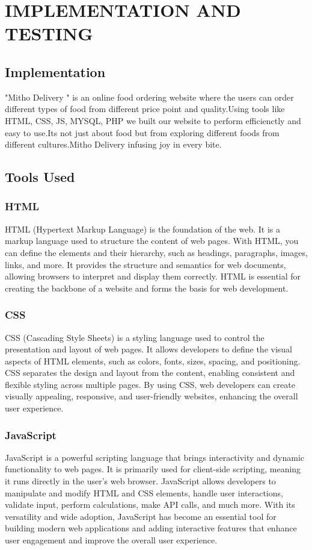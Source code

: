 \chapter{IMPLEMENTATION AND TESTING}
\section{Implementation}
"Mitho Delivery " is an online food ordering website where the users can order different types of food from different price point and quality.Using tools like HTML, CSS, JS, MYSQL, PHP we built our website to perform efficienctly and easy to use.Its not just about food but from exploring different foods from different cultures.Mitho Delivery infusing joy in every bite.
\section{Tools Used}
\subsection*{HTML}
HTML (Hypertext Markup Language) is the foundation of the web. It is a markup language used to structure the content of web pages. With HTML, you can define the elements and their hierarchy, such as headings, paragraphs, images, links, and more. It provides the structure and semantics for web documents, allowing browsers to interpret and display them correctly. HTML is essential for creating the backbone of a website and forms the basis for web development.

\subsection*{CSS}
CSS (Cascading Style Sheets) is a styling language used to control the presentation and layout of web pages. It allows developers to define the visual aspects of HTML elements, such as colors, fonts, sizes, spacing, and positioning. CSS separates the design and layout from the content, enabling consistent and flexible styling across multiple pages. By using CSS, web developers can create visually appealing, responsive, and user-friendly websites, enhancing the overall user experience.

\subsection*{JavaScript}
JavaScript is a powerful scripting language that brings interactivity and dynamic functionality to web pages. It is primarily used for client-side scripting, meaning it runs directly in the user's web browser. JavaScript allows developers to manipulate and modify HTML and CSS elements, handle user interactions, validate input, perform calculations, make API calls, and much more. With its versatility and wide adoption, JavaScript has become an essential tool for building modern web applications and adding interactive features that enhance user engagement and improve the overall user experience.


